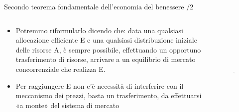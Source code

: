 \documentclass[aspectratio=149,11pt]{beamer}
\begin{document}
\begin{frame}{Secondo teorema fondamentale dell'economia del benessere /2}
\begin{columns}
\begin{column}{.45\columnwidth}
\begin{itemize}
\item Potremmo riformularlo dicendo che: data una qualsiasi allocazione efficiente E e una qualsiasi distribuzione iniziale delle risorse A, è sempre possibile, effettuando un opportuno trasferimento di risorse, arrivare a un equilibrio di mercato concorrenziale che realizza E.
\item Per raggiungere E non c’è necessità di interferire con il meccanismo dei prezzi, basta un trasferimento, da effettuarsi «a monte» del sistema di mercato
\end{itemize}
\end{column}

\begin{column}{.55\columnwidth}
\begin{figure}
\centering
\includegraphics[height=5cm]{./figure/edgeworth-6.pdf}
\end{figure}
\end{column}
\end{columns}
\end{frame}
\end{document}

